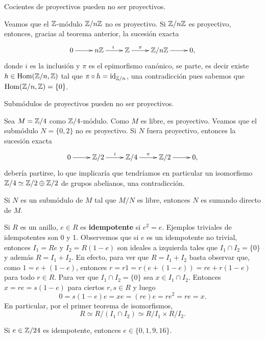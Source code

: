 Cocientes de proyectivos pueden no ser proyectivos. 

\begin{example}
Veamos que el $\mathbb{Z}$-módulo $\mathbb{Z}/n\mathbb{Z}$ no es proyectivo. 
Si $\mathbb{Z}/n\mathbb{Z}$ es proyectivo, entonces, gracias al teorema anterior, 
la sucesión exacta
\[
	\xymatrix{
	 0\ar[r] 
	 & n\Z 
	 \ar[r]^i
	 & \Z
	 \ar[r]^-{\pi}
	 & \Z/n\Z\ar[r]
	 & 0,
	 }
\]
donde $i$ es la inclusión y $\pi$ es el epimorfismo canónico, 
se parte, es decir existe $h\in\operatorname{Hom}(\mathbb{Z}/n,\mathbb{Z})$ tal que $\pi\circ h=\operatorname{id}_{\mathbb{Z}/n}$, una contradicción
pues sabemos que $\operatorname{Hom}(\mathbb{Z}/n,\mathbb{Z})=\{0\}$.
\end{example}

Submódulos de proyectivos pueden no ser proyectivos. 

\begin{example}
Sea $M=\mathbb{Z}/4$ como $\mathbb{Z}/4$-módulo. Como $M$ es libre, es proyectivo. 
Veamos que el submódulo $N=\{0,2\}$ no es proyectivo. Si $N$ fuera proyectivo, entonces
la sucesión exacta
\[
	\xymatrix{
	 0\ar[r] 
	 & \Z/2
	 \ar[r]^i
	 & \Z/4
	 \ar[r]^-{\pi}
	 & \Z/2
	 \ar[r]
	 & 0,
	 }
\]
debería partirse, lo que implicaría que tendríamos en particular un isomorfismo 
$\mathbb{Z}/4\simeq\mathbb{Z}/2\oplus\mathbb{Z}/2$ de grupos abelianos, una contradicción.
\end{example}

\begin{exercise}
\label{xca:cociente_libre}
Si $N$ es un submódulo de $M$ tal que $M/N$ es libre, entonces $N$ es sumando directo de $M$. 	
\end{exercise}

Si $R$ es un anillo, $e\in R$ es \textbf{idempotente} si $e^2=e$. Ejemplos triviales de idempotentes son 0 y 1.
Observemos que si $e$ es un idempotente no trivial, entonces 
$I_1=Re$ y $I_2=R(1-e)$ son ideales a izquierda tales que $I_1\cap I_2=\{0\}$ y además 
$R=I_1+I_2$. En efecto, para ver que $R=I_1+I_2$ basta observar que, como 
$1=e+(1-e)$, entonces $r=r1=r(e+(1-e))=re+r(1-e)$ para todo $r\in R$. Para ver que $I_1\cap I_2=\{0\}$ 
sea $x\in I_1\cap I_2$. Entonces $x=re=s(1-e)$ para ciertos $r,s\in R$ y luego
\[
0=s(1-e)e=xe=(re)e=re^2=re=x.   
\]
En particular, por el primer teorema de isomorfismos, 
\[
R\simeq R/(I_1\cap I_2)\simeq R/I_1\times R/I_2.
\]

\begin{example}
Si $e\in \mathbb{Z}/24$ es idempotente, entonces $e\in\{0,1,9,16\}$.  	
\end{example}

